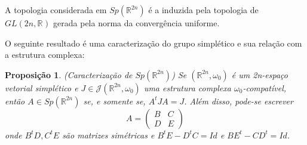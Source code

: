 \documentclass[12pt]{book}
\newtheorem{proposicao}[teorema]{Proposição}
\newcommand{\estruturascomplexas}[2]{\mathcal{J}(#1, #2)}
\newcommand{\generalgroup}[2]{GL(#1, #2)}
\newcommand{\generalgroupreal}[1]{\generalgroup{#1}{\real{}}}
\newcommand{\gruposimpletico}[1]{Sp(#1)}
\newcommand{\real}[1]{\mathbb{R}^{#1}}
\begin{document}
	A topologia considerada em $\gruposimpletico{\real{2n}}$ é a induzida pela topologia de $\generalgroupreal{2n}$ gerada pela norma da convergência uniforme.
	
	O seguinte resultado é uma caracterização do grupo simplético e sua relação com a estrutura complexa:
	
	\begin{proposicao}\label{proposicao_caracterizacao_Sp2n}
		(Caracterização de $\gruposimpletico{\real{2n}}$) Se $(\real{2n}, \omega_{0})$ é um 2n-espaço vetorial simplético e $J \in \estruturascomplexas{\real{2n}}{\omega_{0}}$ uma estrutura complexa $\omega_{0}$-compatível, então $A\in \gruposimpletico{\real{2n}}$ se, e somente se, $A^{t}JA = J$. Além disso, pode-se escrever 
		$$
		A=
		\left(
		\begin{array}{cc}
		B & C
		\\
		D & E
		\end{array}
		\right)
		$$
		onde $B^{t}D, C^{t}E$ são matrizes simétricas e $B^{t}E - D^{t}C = Id$ e $BE^{t} - CD^{t} = Id$.
	\end{proposicao}
\end{document}
